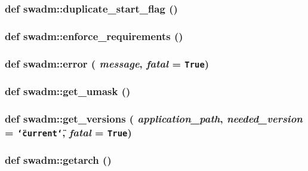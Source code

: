 \subsubsection{\setlength{\rightskip}{0pt plus 5cm}def swadm::duplicate\_\-start\_\-flag ()}\label{namespaceswadm_eb43123e74a21f8da180b9ca5f4278d3}


\subsubsection{\setlength{\rightskip}{0pt plus 5cm}def swadm::enforce\_\-requirements ()}\label{namespaceswadm_cdcd7c22d57f14687fe49dec5bce8d92}


\subsubsection{\setlength{\rightskip}{0pt plus 5cm}def swadm::error ( {\em message},  {\em fatal} = {\tt True})}\label{namespaceswadm_14c80583a91280ebf2ff39ad097095f9}


\subsubsection{\setlength{\rightskip}{0pt plus 5cm}def swadm::get\_\-umask ()}\label{namespaceswadm_921bc29fc81225fd10375fd81c5dede5}


\subsubsection{\setlength{\rightskip}{0pt plus 5cm}def swadm::get\_\-versions ( {\em application\_\-path},  {\em needed\_\-version} = {\tt \char`\"{}current\char`\"{}},  {\em fatal} = {\tt True})}\label{namespaceswadm_3a0766b8dac925402d39a1d8bd4070ac}


\subsubsection{\setlength{\rightskip}{0pt plus 5cm}def swadm::getarch ()}\label{namespaceswadm_1478d56ebb801adfe56eea206f242d2c}


